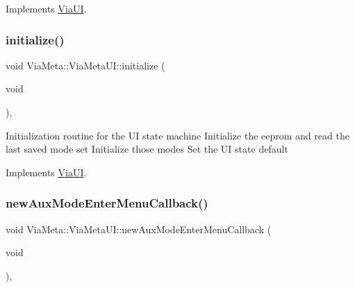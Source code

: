 Implements \mbox{\hyperlink{class_via_u_i_a226eb7b65b6035a611dd734d965fa7c2}{Via\+UI}}.

\mbox{\label{class_via_meta_1_1_via_meta_u_i_ac2bc1bfeb6ef0045d234bd5b89f9ec99}} 
\subsubsection{\texorpdfstring{initialize()}{initialize()}}
{\footnotesize\ttfamily void Via\+Meta\+::\+Via\+Meta\+U\+I\+::initialize (\begin{DoxyParamCaption}\item[{void}]{ }\end{DoxyParamCaption})\hspace{0.3cm}{\ttfamily [override]}, {\ttfamily [virtual]}}

Initialization routine for the UI state machine Initialize the eeprom and read the last saved mode set Initialize those modes Set the UI state default 

Implements \mbox{\hyperlink{class_via_u_i_a573ba7aef8f4982ec4900258c770bdbb}{Via\+UI}}.

\mbox{\label{class_via_meta_1_1_via_meta_u_i_a5a1034beff03b3c5cdc12a9b3a7d0834}} 
\subsubsection{\texorpdfstring{new\+Aux\+Mode\+Enter\+Menu\+Callback()}{newAuxModeEnterMenuCallback()}}
{\footnotesize\ttfamily void Via\+Meta\+::\+Via\+Meta\+U\+I\+::new\+Aux\+Mode\+Enter\+Menu\+Callback (\begin{DoxyParamCaption}\item[{void}]{ }\end{DoxyParamCaption})\hspace{0.3cm}{\ttfamily [override]}, {\ttfamily [virtual]}}



